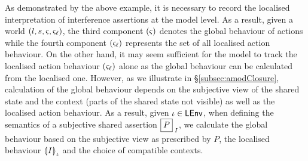 As demonstrated by the above example, it is necessary to record the localised interpretation of interference assertions at the model level. As a result, given a world $(l, s, \amod{}, \amod{\ell})$, the third component $(\amod{})$ denotes the global behaviour of actions while the fourth component $(\amod{\ell})$ represents the set of all localised action behaviour.
On the other hand, it may seem sufficient for the model to track the localised action behaviour $(\amod{\ell})$ alone as the global behaviour can be calculated from the localised one. However, as we illustrate in \S\ref{subsec:amodClosure}, calculation of the global behaviour depends on the subjective view of the shared state and the context (parts of the shared state not visible) as well as the localised action behaviour. As a result, given $\lenv \in \LEnv$, when defining the semantics of a subjective shared assertion $\shared{P}{I}$, we calculate the global behaviour based on the subjective view as prescribed by $P$, the localised behaviour $\semI[\lenv]{I}$ and the choice of compatible contexts. 
